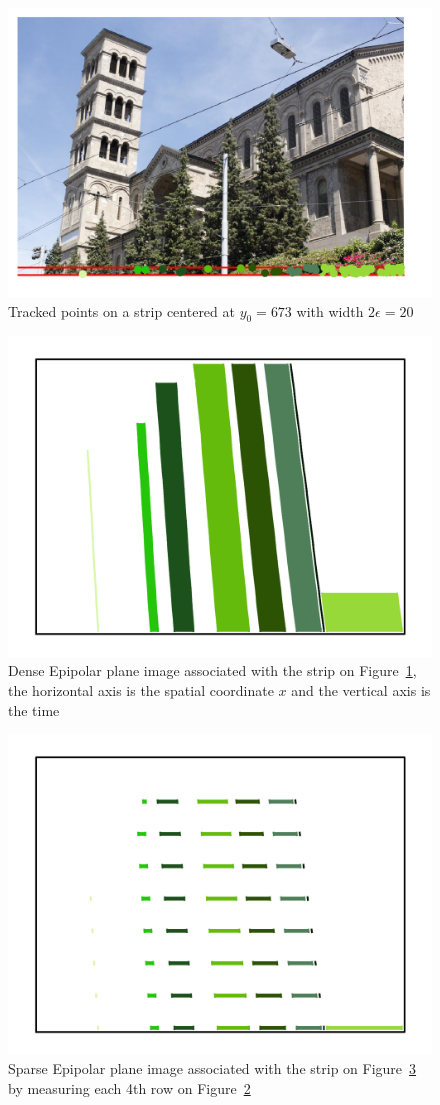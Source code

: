 \begin{figure}[h!]
\centering
\includegraphics[width = 0.6 \textwidth]{./EPIs_Strips/EPIs/673_10_102_4_48_8_strip.png}
\caption{Tracked points on a strip centered at $y_0=673$ with width $2\epsilon=20$}
\label{fig:673_10_102_4_48_8_strip}
\end{figure}

\begin{figure}[h!]
\centering
\includegraphics[width = 0.6 \textwidth]{./EPIs_Strips/EPIs/673_10_102_4_48_8_dense.png}
\caption{Dense Epipolar plane image associated with the strip on Figure~\ref{fig:673_10_102_4_48_8_strip}, the horizontal axis is the spatial coordinate $x$ and the vertical axis is the time}
\label{fig:673_10_102_4_48_8_dense}
\end{figure}

\begin{figure}[h!]
\centering
\includegraphics[width = 0.6 \textwidth]{./EPIs_Strips/EPIs/673_10_102_4_48_8_sparse.png}
\caption{Sparse Epipolar plane image associated with the strip on Figure~\ref{fig:673_10_102_4_48_8_sparse} by measuring each 4th row on Figure~\ref{fig:673_10_102_4_48_8_dense}}
\label{fig:673_10_102_4_48_8_sparse}
\end{figure}

